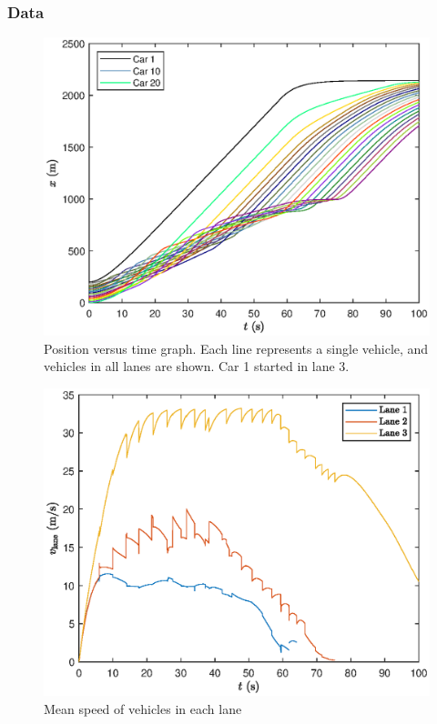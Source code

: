 \documentclass[12pt]{article}
\begin{document}
    \subsubsection{Data}

    \begin{figure}[H]
      \begin{center}
        \includegraphics[width=13cm]{mlbn_x.eps}
        \caption{Position versus time graph. Each line represents a single vehicle, and vehicles in all lanes are shown. Car 1 started in lane 3.}
        \label{fig:multi lane x}
      \end{center}
    \end{figure}

    \begin{figure}[H]
      \begin{center}
        \includegraphics[width=13cm]{mlbn_laneSpeed.eps}
        \caption{Mean speed of vehicles in each lane  }
        \label{fig:mean lane speed}
      \end{center}
    \end{figure}
\end{document}
